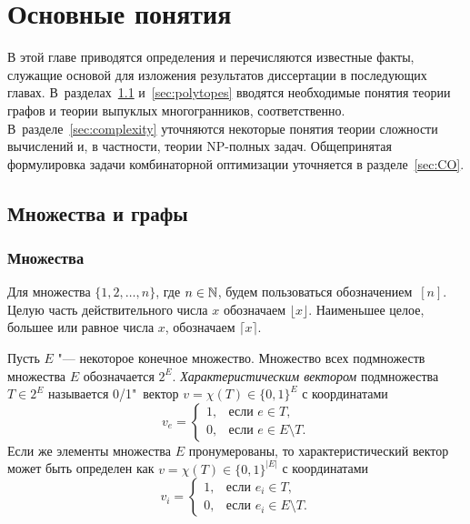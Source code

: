 
\chapter{Основные понятия}

В этой главе приводятся определения и перечисляются известные факты, служащие основой для изложения результатов диссертации в последующих главах.
В~разделах~\ref{sec:graphs} и~\ref{sec:polytopes} вводятся необходимые понятия 
теории графов и теории выпуклых многогранников, соответственно.
В~разделе~\ref{sec:complexity} уточняются некоторые понятия теории сложности вычислений %
и, в частности, теории NP-полных задач. Общепринятая формулировка задачи комбинаторной оптимизации уточняется в разделе~\ref{sec:CO}.


\section{Множества и графы}
\label{sec:graphs}

\subsection{Множества}

Для множества $\{1,2,\dots,n\}$, где $n\in \mathbb{N}$, будем пользоваться обозначением~$[n]$. 
Целую часть %
действительного числа $x$ обозначаем $\lfloor x \rfloor$.
Наименьшее целое, большее или равное числа $x$, обозначаем $\lceil x\rceil$.

Пусть $E$ "--- некоторое конечное множество. 
Множество всех подмножеств множества $E$ обозначается $2^E$.
\emph{Характеристическим вектором} подмножества $T \in 2^E$ называется 0/1"~вектор $v = \chi(T) \in \{0,1\}^E$ с координатами
\[
v_{e} = \begin{cases}
1,& \text{если $e\in T$,}\\
0,& \text{если $e\in E\setminus T$.}
\end{cases}
\]
Если же элементы множества $E$ пронумерованы, то характеристический вектор может быть определен как $v = \chi(T) \in \{0,1\}^{|E|}$ с координатами
\[
v_{i} = \begin{cases}
1,& \text{если $e_i\in T$,}\\
0,& \text{если $e_i\in E\setminus T$.}
\end{cases}
\]


